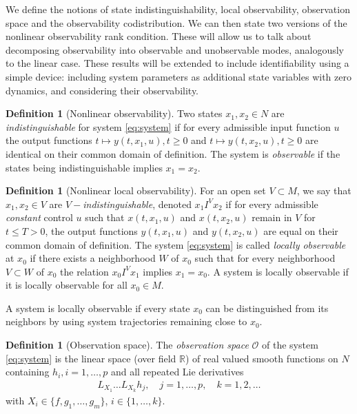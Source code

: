 \documentclass[psamsfonts]{amsart}
\theoremstyle{definition}
\newtheorem{defn}[thm]{Definition}
\theoremstyle{remark}
\newcommand*\R{\mathds{R}}
\numberwithin{equation}{section}
\begin{document}
We define the notions of state indistinguishability, local observability, observation space and the observability codistribution. We can then state two versions of the nonlinear observability rank condition. These will allow us to talk about decomposing observability into observable and unobservable modes, analogously to the linear case. These results will be extended to include identifiability using a simple device: including system parameters as additional state variables with zero dynamics, and considering their observability. 

\begin{defn}[Nonlinear observability]
    Two states $x_1, x_2\in N$ are \textit{indistinguishable} for system \eqref{eq:system} if for every admissible input function $u$ the output functions $t\mapsto y(t, x_1, u), t\geq 0$ and $t\mapsto y(t, x_2, u), t\geq 0$ are identical on their common domain of definition. The system is \textit{observable} if the states being indistinguishable implies $x_1=x_2$. 
\end{defn}

\begin{defn}[Nonlinear local observability]
    For an open set $V\subset M$, we say that $x_1, x_2 \in V$ are \textit{$V-$indistinguishable}, denoted $x_1 I^V x_2$ if for every admissible \textit{constant} control $u$ such that $x(t, x_1, u)$ and $x(t, x_2, u)$ remain in $V$ for $t\leq T > 0$, the output functions $y(t, x_1, u)$ and $y(t, x_2, u)$ are equal on their common domain of definition. The system \eqref{eq:system} is called \textit{locally observable} at $x_0$ if there exists a neighborhood $W$ of $x_0$ such that for every neighborhood $V\subset W$ of $x_0$ the relation $x_0 I^V x_1$ implies $x_1 = x_0$. A system is locally observable if it is locally observable for all $x_0 \in M$. 
\end{defn}

A system is locally observable if every state $x_0$ can be distinguished from its neighbors by using system trajectories remaining close to $x_0$. 

\begin{defn}[Observation space]
    The \textit{observation space} $\mathscr{O}$ of the system \eqref{eq:system} is the linear space (over field $\R$) of real valued smooth functions on $N$ containing $h_i, i = 1, \dots, p$ and all repeated Lie derivatives 
    \begin{align}
        L_{X_1}\dots L_{X_k}h_j, \quad j = 1,\dots, p, \quad k = 1,2, \dots
    \end{align}
    with $X_i \in \{f, g_1, \dots, g_m\}$, $i\in\{1, \dots, k\}$. 
\end{defn}
\end{document}
